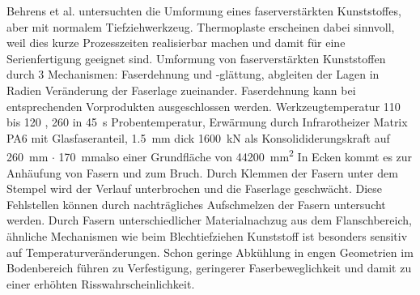 Behrens et al. \cite{Behrens2017} untersuchten die Umformung eines faserverstärkten Kunststoffes, aber mit normalem Tiefziehwerkzeug.
Thermoplaste erscheinen dabei sinnvoll, weil dies kurze Prozesszeiten realisierbar machen und damit für eine Serienfertigung geeignet sind.
Umformung von faserverstärkten Kunststoffen durch 3 Mechanismen: Faserdehnung und -glättung, abgleiten der Lagen in Radien Veränderung der Faserlage zueinander.
Faserdehnung kann bei entsprechenden Vorprodukten ausgeschlossen werden.
Werkzeugtemperatur \SI{110}{\dC} bis \SI{120}{\dC} , \SI{260}{\dC} in \SI{45}{\second} Probentemperatur, Erwärmung durch Infrarotheizer
Matrix PA6 mit Glasfaseranteil, \SI{1.5}{\mm} dick
\SI{1600}{\kN} als Konsolididerungskraft auf \SI{260}{\mm} $\cdot$ \SI{170}{\mm}also einer Grundfläche von \SI{44200}{\mm\squared}
In Ecken kommt es zur Anhäufung von Fasern und zum Bruch.
Durch Klemmen der Fasern unter dem Stempel wird der Verlauf unterbrochen und die Faserlage geschwächt.
Diese Fehlstellen können durch nachträgliches Aufschmelzen der Fasern untersucht werden.
Durch Fasern unterschiedlicher Materialnachzug aus dem Flanschbereich, ähnliche Mechanismen wie beim Blechtiefziehen
Kunststoff ist besonders sensitiv auf Temperaturveränderungen.
Schon geringe Abkühlung in engen Geometrien im Bodenbereich führen zu Verfestigung, geringerer Faserbeweglichkeit und damit zu einer erhöhten Risswahrscheinlichkeit.\cite{Behrens2017}

